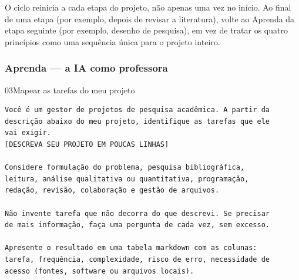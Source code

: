 \documentclass[11pt,a4paper]{article}
\begin{document}
\begin{center}
\end{center}
\begin{dica}
O ciclo reinicia a cada etapa do projeto, não apenas uma vez no início. Ao final de uma etapa (por exemplo, depois de revisar a literatura), volte ao Aprenda da etapa seguinte (por exemplo, desenho de pesquisa), em vez de tratar os quatro princípios como uma sequência única para o projeto inteiro.
\end{dica}

\subsubsection*{Aprenda --- a IA como professora}

\begin{modelo}{03}{Mapear as tarefas do meu projeto}
\begin{lstlisting}
Você é um gestor de projetos de pesquisa acadêmica. A partir da
descrição abaixo do meu projeto, identifique as tarefas que ele
vai exigir.
[DESCREVA SEU PROJETO EM POUCAS LINHAS]

Considere formulação do problema, pesquisa bibliográfica,
leitura, análise qualitativa ou quantitativa, programação,
redação, revisão, colaboração e gestão de arquivos.

Não invente tarefa que não decorra do que descrevi. Se precisar
de mais informação, faça uma pergunta de cada vez, sem excesso.

Apresente o resultado em uma tabela markdown com as colunas:
tarefa, frequência, complexidade, risco de erro, necessidade de
acesso (fontes, software ou arquivos locais).
\end{lstlisting}
\end{modelo}
\end{document}
